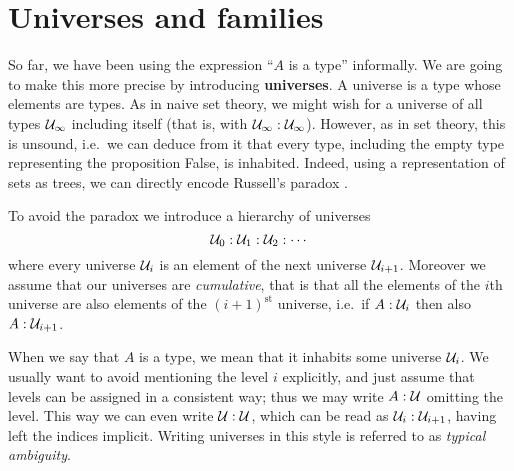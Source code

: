 \section{Universes and families}
\label{sec:universes}

So far, we have been using the expression ``$A$ is a type'' informally. We
are going to make this more precise by introducing \textbf{universes}.
A universe is a type whose elements are types. As in naive set theory,
we might wish for a universe of all types $\mathcal{U}_\infty$ including itself
(that is, with $\mathcal{U}_\infty : \mathcal{U}_\infty$).
However, as in set
theory, this is unsound, i.e.\ we can deduce from it that every type,
including the empty type representing the proposition False, is inhabited. Indeed, using a
representation of sets as trees, we can directly encode Russell's
paradox \cite{coquand:paradox}.

To avoid the paradox we introduce a hierarchy of universes
\[ \mathcal{U}_0 : \mathcal{U}_1 : \mathcal{U}_2 : \cdots \]
where every universe $\mathcal{U}_i$ is an element of the next universe
$\mathcal{U}_{i+1}$. Moreover we assume that our universes are
\emph{cumulative}, that is that all the elements of the $i$th
universe are also elements of the $(i+1)^{\mathrm{st}}$ universe, i.e.\ if
$A:\mathcal{U}_i$ then also $A:\mathcal{U}_{i+1}$.


When we say that $A$ is a type, we mean that it inhabits some universe
$\mathcal{U}_i$. We usually want to avoid mentioning the level $i$ explicitly,
and just assume that levels can be assigned in a consistent way; thus we
may write $A:\mathcal{U}$ omitting the level. This way we can even write
$\mathcal{U}:\mathcal{U}$, which can be read as $\mathcal{U}_i:\mathcal{U}_{i+1}$, having left the
indices implicit.  Writing universes in this style is referred to as
{\em typical ambiguity}.

